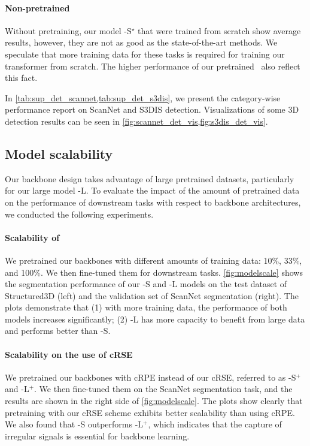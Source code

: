 \documentclass[10pt,twocolumn,letterpaper]{article}
\begin{document}
\paragraph{Non-pretrained \SST}
Without pretraining, our model \SST-S$^\star$ that were trained from scratch show average results, however, they are not as good as the state-of-the-art methods. We speculate that more training data for these tasks is required for training our transformer from scratch. The higher performance of our pretrained \SST ~also reflect this fact.


In \cref{tab:sup_det_scannet,tab:sup_det_s3dis}, we present the category-wise performance report on ScanNet and S3DIS detection. Visualizations of some 3D detection results can be seen in \cref{fig:scannet_det_vis,fig:s3dis_det_vis}.

\subsection{Model scalability} \label{subsec:eval_scale}
Our backbone design takes advantage of large pretrained datasets, particularly for our large model {\SST}-L. To evaluate the impact of the amount of pretrained data on the performance of downstream tasks with respect to backbone architectures, we conducted the following experiments.

\paragraph{Scalability of {\SST}} We pretrained our backbones with different amounts of training data: 10\%, 33\%, and 100\%. We then fine-tuned them for downstream tasks. \cref{fig:modelscale} shows the segmentation performance of our {\SST}-S and {\SST}-L models on the test dataset of Structured3D (left) and the validation set of ScanNet segmentation (right). The plots demonstrate that (1) with more training data, the performance of both models increases significantly; (2) {\SST}-L has more capacity to benefit from large data and performs better than {\SST}-S.

\paragraph{Scalability on the use of cRSE}
We pretrained our backbones with cRPE instead of our cRSE, referred to as {\SST}-S$^+$ and {\SST}-L$^+$. We then fine-tuned them on the ScanNet segmentation task, and the results are shown in the right side of \cref{fig:modelscale}. The plots show clearly that pretraining with our cRSE scheme exhibits better scalability than using cRPE. We also found that \SST-S
outperforms {\SST}-L$^+$, which indicates that the capture of irregular signals is essential for backbone learning.
\end{document}
